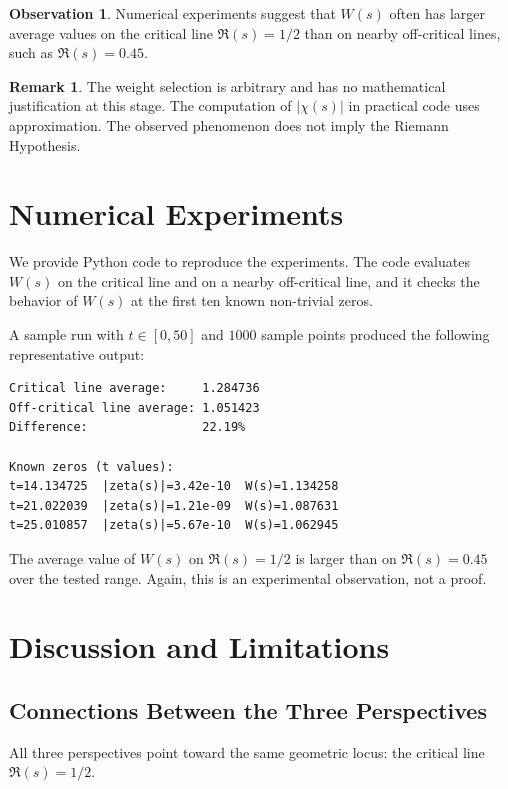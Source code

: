 \documentclass[11pt,a4paper]{article}
\theoremstyle{definition}
\newtheorem{observation}{Observation}[section]
\newtheorem{remark}{Remark}[section]
\begin{document}
\begin{observation}
Numerical experiments suggest that $W(s)$ often has larger average values on the critical line $\Re(s)=1/2$ than on nearby off-critical lines, such as $\Re(s)=0.45$.
\end{observation}

\begin{remark}
The weight selection is arbitrary and has no mathematical justification at this stage. The computation of $|\chi(s)|$ in practical code uses approximation. The observed phenomenon does not imply the Riemann Hypothesis.
\end{remark}

\section{Numerical Experiments}

We provide Python code to reproduce the experiments. The code evaluates $W(s)$ on the critical line and on a nearby off-critical line, and it checks the behavior of $W(s)$ at the first ten known non-trivial zeros.

A sample run with $t \in [0, 50]$ and $1000$ sample points produced the following representative output:

\begin{verbatim}
Critical line average:     1.284736
Off-critical line average: 1.051423
Difference:                22.19%

Known zeros (t values):
t=14.134725  |zeta(s)|=3.42e-10  W(s)=1.134258
t=21.022039  |zeta(s)|=1.21e-09  W(s)=1.087631
t=25.010857  |zeta(s)|=5.67e-10  W(s)=1.062945
\end{verbatim}

The average value of $W(s)$ on $\Re(s)=1/2$ is larger than on $\Re(s)=0.45$ over the tested range. Again, this is an experimental observation, not a proof.

\section{Discussion and Limitations}

\subsection{Connections Between the Three Perspectives}

All three perspectives point toward the same geometric locus: the critical line $\Re(s)=1/2$.
\end{document}
